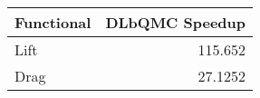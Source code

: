 \begin{tabular}{lr}
\toprule
 Functional   &   DLbQMC Speedup \\
\midrule
 Lift         &         115.652  \\
 Drag         &          27.1252 \\
\bottomrule
\end{tabular}
